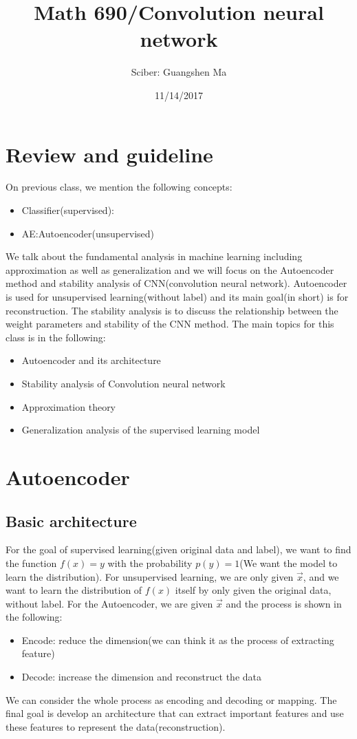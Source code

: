 \documentclass{article}
\title{Math 690/Convolution neural network}
\author{Sciber: Guangshen Ma}
\date{11/14/2017}
\begin{document}
\maketitle

\section{Review and guideline}
On previous class, we mention the following concepts:
\begin{itemize}
\item Classifier(supervised):
\item AE:Autoencoder(unsupervised)
\end{itemize}
We talk about the fundamental analysis in machine learning including approximation as well as generalization and we will focus on the Autoencoder method and stability analysis of CNN(convolution neural network). Autoencoder is used for unsupervised learning(without label) and its main goal(in short) is for reconstruction. The stability analysis is to discuss the relationship between the weight parameters and stability of the CNN method. The main topics for this class is in the following:
\begin{itemize}
\item Autoencoder and its architecture
\item Stability analysis of Convolution neural network
\item Approximation theory
\item Generalization analysis of the supervised learning model
\end{itemize}

\section{Autoencoder}
\subsection{Basic architecture}
For the goal of supervised learning(given original data and label), we want to find the function $f(x) = y$ with the probability $p(y) = 1$(We want the model to learn the distribution). For unsupervised learning, we are only given $\overrightarrow{x}$, and we want to learn the distribution of $f(x)$ itself by only given the original data, without label.
\noindent
For the Autoencoder, we are given $\overrightarrow{x}$ and the process is shown in the following:
\begin{itemize}
\item Encode: reduce the dimension(we can think it as the process of extracting feature)
\item Decode: increase the dimension and reconstruct the data
\end{itemize}
We can consider the whole process as encoding and decoding or mapping. The final goal is develop an architecture that can extract important features and use these features to represent the data(reconstruction).
\end{document}
